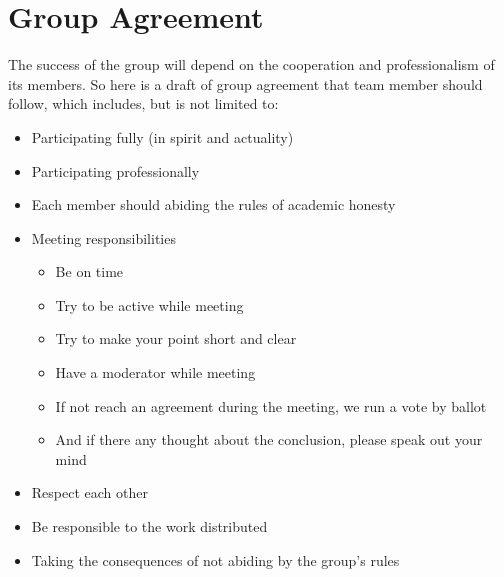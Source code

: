 \newpage
\section{Group Agreement}
The success of the group will depend on the cooperation and professionalism of its members. So here is a draft of group agreement that team member should follow, which includes, but is not limited to:
\begin{itemize}
    \item Participating fully (in spirit and actuality)
    \item Participating professionally
    \item Each member should abiding the rules of academic honesty
    \item Meeting responsibilities
    \begin{itemize}
        \item Be on time
        \item Try to be active while meeting
        \item Try to make your point short and clear
        \item Have a moderator while meeting
        \item If not reach an agreement during the meeting, we run a vote by ballot 
        \item And if there any thought about the conclusion, please speak out your mind
    \end{itemize}
    \item Respect each other
    \item Be responsible to the work distributed
    \item Taking the consequences of not abiding by the group's rules
\end{itemize}
    
